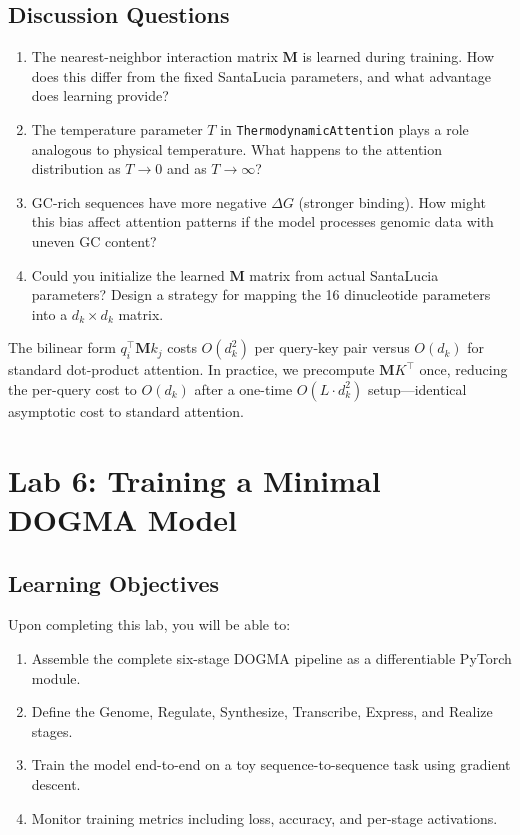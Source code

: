 \subsection{Discussion Questions}

\begin{enumerate}[leftmargin=1.8em]
  \item The nearest-neighbor interaction matrix $\mathbf{M}$ is learned during training. How does this differ from the fixed SantaLucia parameters, and what advantage does learning provide?
  \item The temperature parameter $T$ in \texttt{ThermodynamicAttention} plays a role analogous to physical temperature. What happens to the attention distribution as $T \to 0$ and as $T \to \infty$?
  \item GC-rich sequences have more negative $\Delta G$ (stronger binding). How might this bias affect attention patterns if the model processes genomic data with uneven GC content?
  \item Could you initialize the learned $\mathbf{M}$ matrix from actual SantaLucia parameters? Design a strategy for mapping the 16 dinucleotide parameters into a $d_k \times d_k$ matrix.
\end{enumerate}

\begin{implnote}
The bilinear form $q_i^\top \mathbf{M} k_j$ costs $O(d_k^2)$ per query-key pair versus $O(d_k)$ for standard dot-product attention. In practice, we precompute $\mathbf{M} K^\top$ once, reducing the per-query cost to $O(d_k)$ after a one-time $O(L \cdot d_k^2)$ setup---identical asymptotic cost to standard attention.
\end{implnote}


\section{Lab 6: Training a Minimal DOGMA Model}
\label{sec:lab6-dogma-training}

\subsection{Learning Objectives}

Upon completing this lab, you will be able to:
\begin{enumerate}[leftmargin=1.8em]
  \item Assemble the complete six-stage DOGMA pipeline as a differentiable PyTorch module.
  \item Define the Genome, Regulate, Synthesize, Transcribe, Express, and Realize stages.
  \item Train the model end-to-end on a toy sequence-to-sequence task using gradient descent.
  \item Monitor training metrics including loss, accuracy, and per-stage activations.
\end{enumerate}

